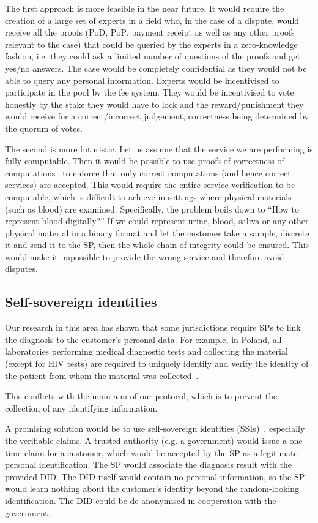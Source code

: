 \documentclass[pdftex,twocolumn,epjc3]{svjour3}
\begin{document}
{The first approach is more feasible in the near future. It would require the creation of a large set of experts in a field who, in the case of a dispute, would receive all the proofs ($\mathrm{PoD}$, $\mathrm{PoP}$, payment $\mathrm{receipt}$ as well as any other proofs relevant to the case) that could be queried by the experts in a zero-knowledge fashion, i.e. they could ask a limited number of questions of the proofs and get yes/no answers. The case would be completely confidential as they would not be able to query any personal information. Experts would be incentivised to participate in the pool by the fee system. They would be incentivised to vote honestly by the stake they would have to lock and the reward/punishment they would receive for a correct/incorrect judgement, correctness being determined by the quorum of votes.

The second is more futuristic. Let us assume that the service we are performing is fully computable. Then it would be possible to use proofs of correctness of computations~\cite{ben-sassonSNARKsVerifyingProgram2013} to enforce that only correct computations (and hence correct services) are accepted. This would require the entire service verification to be computable, which is difficult to achieve in settings where physical materials (such as blood) are examined. Specifically, the problem boils down to ``How to represent blood digitally?'' If we could represent urine, blood, saliva or any other physical material in a binary format and let the customer take a sample, discrete it and send it to the SP, then the whole chain of integrity could be ensured. This would make it impossible to provide the wrong service and therefore avoid disputes.

\subsection{Self-sovereign identities}
Our research in this area has shown that some jurisdictions require SPs to link the diagnosis to the customer's personal data. For example, in Poland, all laboratories performing medical diagnostic tests and collecting the material (except for HIV tests) are required to uniquely identify and verify the identity of the patient from whom the material was collected~\cite{ministerstwozdrowiaRegulationMinisterHealth2006}.

This conflicts with the main aim of our protocol, which is to prevent the collection of any identifying information.

A promising solution would be to use self-sovereign identities (SSIs)~\cite{muhleSurveyEssentialComponents2018}, especially the verifiable claims. A trusted authority (e.g. a government) would issue a one-time claim for a customer, which would be accepted by the SP as a legitimate personal identification. The SP would associate the diagnosis result with the provided DID. The DID itself would contain no personal information, so the SP would learn nothing about the customer's identity beyond the random-looking identification. The DID could be de-anonymised in cooperation with the government.

}
\end{document}
